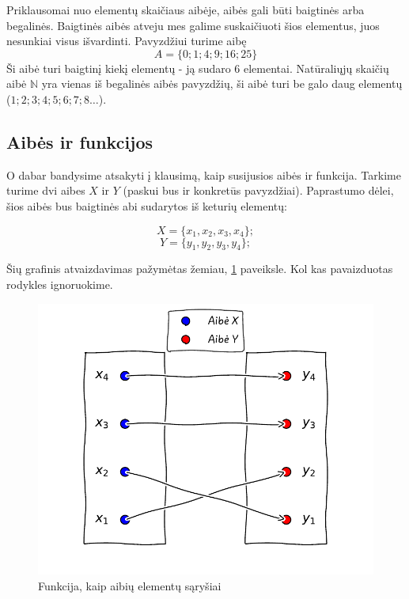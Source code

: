 \documentclass[nobib]{tufte-handout}
\begin{document}
Priklausomai nuo elementų skaičiaus aibėje, aibės gali būti baigtinės arba
begalinės. Baigtinės aibės atveju mes galime suskaičiuoti šios elementus, juos
nesunkiai visus išvardinti. Pavyzdžiui turime aibę
$$A=\{0; 1; 4; 9; 16; 25\} $$
Ši aibė turi baigtinį kiekį elementų - ją sudaro 6 elementai. Natūraliųjų
skaičių aibė $\mathbb{N}$ yra vienas iš begalinės aibės pavyzdžių, ši aibė turi
be galo daug
elementų ($1;2;3;4;5;6;7;8\ldots$).

\subsection{Aibės ir funkcijos}\label{sec:about_sets_and_functions}

O dabar bandysime atsakyti į klausimą, kaip susijusios aibės ir funkcija.
Tarkime turime dvi aibes $X$ ir $Y$ (paskui bus ir konkretūs pavyzdžiai).
Paprastumo dėlei, šios aibės bus baigtinės abi sudarytos iš keturių elementų:

$$X = \{x_{1},x_{2},x_{3},x_{4}\};$$
$$Y = \{y_{1},y_{2},y_{3},y_{4}\};$$

Šių grafinis atvaizdavimas pažymėtas žemiau,
\ref{fig:function_as_sets_elements_relation} paveiksle. Kol kas pavaizduotas
rodykles ignoruokime.

\begin{figure}[!htpb]
  \includegraphics{./graphs/functions_as_graphs.pdf}
  \caption{Funkcija, kaip aibių elementų sąryšiai}
  \label{fig:function_as_sets_elements_relation}
\end{figure}
\end{document}
